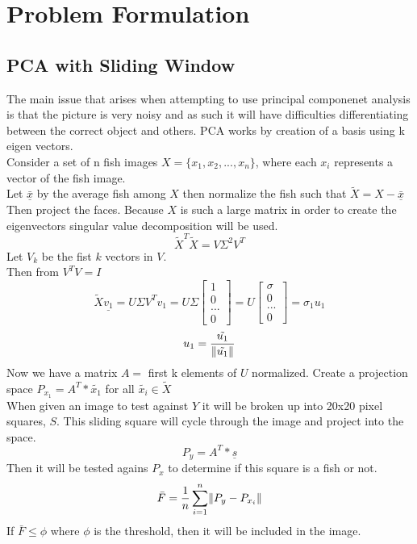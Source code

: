 \documentclass[11pt]{article} %
\renewcommand{\vec}[1]{\underline{#1}}
\DeclarePairedDelimiter{\norm}{\lVert}{\rVert}
\begin{document}
\section{Problem Formulation}
\subsection{PCA with Sliding Window}
The main issue that arises when attempting to use principal componenet analysis is that the picture is very noisy
and as such it will have difficulties differentiating between the correct object and others. PCA works by
creation of a basis using k eigen vectors. \\
Consider a set of n fish images $X=\{x_1,x_2,...,x_n\}$, where each $x_i$ represents a vector of the fish image.\\
Let $\bar{\vec{x}}$ by the average fish among $X$ then normalize the fish such that $\tilde{X} = X- \bar{\vec{x}}$ \\
Then project the faces. Because $X$ is such a large matrix in order to create the eigenvectors singular value decomposition will be used.\\
\[\tilde{X}^{T}\tilde{X} = V \Sigma ^2 V^{T} \]
Let $V_k$ be the fist $k$ vectors in $V$. \\
Then from $V^{T}V=I$
\[ \tilde{X} \vec{v_1} = U \Sigma V^{T} v_{1} = U \Sigma \begin{bmatrix}1 \\0 \\...\\ 0 \end{bmatrix} = U\begin{bmatrix}\sigma \\ 0 \\... \\0\end{bmatrix} = \sigma_1 u_1 \]
\[u_1 = \frac{\tilde{u_1}}{\norm{\tilde{u_1}}} \]
Now we have a matrix $A = $ first k elements of $U$ normalized. Create a projection space $P_{x_1} = A^{T}*\tilde{x_1}$ for all $\tilde{x_i}\in\tilde{X}$
\\
When given an image to test against $Y$ it will be broken up into 20x20 pixel squares, $S$. This sliding square will cycle through the image and project into the space.
\[P_y = A^{T}*\vec{s} \]
Then it will be tested agains $P_x$ to determine if this square is a fish or not.
\[\bar{F} = \frac{1}{n} \sum_{i=1}^n \norm{P_y - P_{x_i}} \]
If $\bar{F}\leq \phi$ where $\phi$ is the threshold, then it will be included in the image.
\end{document}

